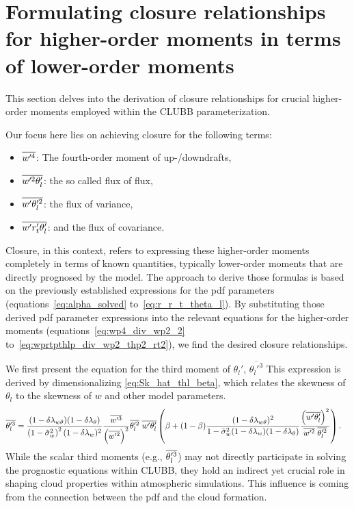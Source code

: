 \section{Formulating closure relationships for higher-order moments in terms of lower-order moments}
\label{sec:prop_closure}

This section delves into the derivation of closure relationships for crucial higher-order moments
employed within the \gls{CLUBB} parameterization.

Our focus here lies on achieving closure for the following terms:
\begin{itemize}
    \item $\overline{w'^4}$: The fourth-order moment of up-/downdrafts,
    \item $\overline{w'^2 \theta_l'}$: the so called flux of flux,
    \item $\overline{w' \theta_l'^2}$: the flux of variance,
    \item $\overline{w' r_t' \theta_l'}$: and the flux of covariance.
\end{itemize}
Closure, in this context,
refers to expressing these higher-order moments completely in terms of known quantities,
typically lower-order moments that are directly prognosed by the model.
The approach to derive those formulas is based on
the previously established expressions for the \gls{pdf} parameters (equations~\eqref{eq:alpha_solved} to~\eqref{eq:r_r_t_theta_l}).
By substituting those derived \gls{pdf} parameter expressions
into the relevant equations for the higher-order moments (equations~\eqref{eq:wp4_div_wp2_2} to~\eqref{eq:wprtpthlp_div_wp2_thp2_rt2}),
we find the desired closure relationships.

We first present the equation for the third moment of $\theta_l'$, $\overline{\theta_l'^3}$
This expression is derived by dimensionalizing \cref{eq:Sk_hat_thl_beta},
which relates the skewness of $\theta_l$ to the skewness of $w$ and other model parameters.
\begin{align}
    \label{eq:thlp3_beta}
    \overline{\theta_l'^3}
    &= \frac{(1-\delta \lambda_{w \theta})(1-\delta \lambda_\theta)}{\left( 1 - \tilde{\sigma}_w^2 \right)^2 (1-\delta \lambda_w)^2}
    \frac{\overline{w'^3}}{\left( \overline{w'^2} \right)^2}
    \overline{\theta_l'^2} \;
    \overline{w'\theta_l'}
    \left(\beta + (1-\beta)
    \frac{(1-\delta \lambda_{w \theta})^2}{1-\tilde{\sigma}_w^2 (1-\delta \lambda_w)(1-\delta \lambda_\theta)}
    \frac{\left(\overline{w'\theta_l'}\right)^2}{\overline{w'^2} \; \overline{\theta_l'^2}}\right).
\end{align}
While the scalar third moments (e.g., $\overline{\theta_l'^3}$) may not directly participate
in solving the prognostic equations within \gls{CLUBB},
they hold an indirect yet crucial role in shaping cloud properties within atmospheric simulations.
This influence is coming from the connection between the \gls{pdf} and the cloud formation.

